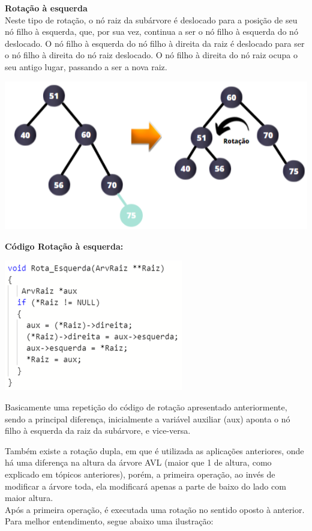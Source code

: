 \documentclass[11pt]{article} %
\begin{document}
\begin{enumerate}[a)]
\newpage
{\bf Rotação à esquerda} \\
\hspace*{1cm} Neste tipo de rotação, o nó raiz da subárvore é deslocado para a posição de seu nó filho à esquerda, que, por sua vez, continua a ser o nó filho à esquerda do nó deslocado. O nó filho à esquerda do nó filho à direita da raiz é deslocado para ser o nó filho à direita do nó raiz deslocado. O nó filho à direita do nó raiz ocupa o seu antigo lugar, passando a ser a nova raiz.

		\begin{center}
			\includegraphics[scale = 0.85]{rotaesqim.png}
		\end{center}	
	
	{\bf Código Rotação à esquerda:} \\
		\begin{center}
			\includegraphics[scale = 0.85]{rotaesquerda.png}
		\end{center}	
{\small Basicamente uma repetição do código de rotação apresentado anteriormente, sendo a principal diferença, inicialmente a variável auxiliar (aux) aponta o nó filho à esquerda da raiz da subárvore, e vice-versa.}

\newpage

\hspace*{1cm} Também existe a rotação dupla, em que é utilizada as aplicações anteriores, onde há uma diferença na altura da árvore AVL (maior que 1 de altura, como explicado em tópicos anteriores), porém, a primeira operação, ao invés de modificar a árvore toda, ela modificará apenas a parte de baixo do lado com maior altura.\\ Após a primeira operação, é executada uma rotação no sentido oposto à anterior. Para melhor entendimento, segue abaixo uma ilustração: 


\end{enumerate}
\end{document}
